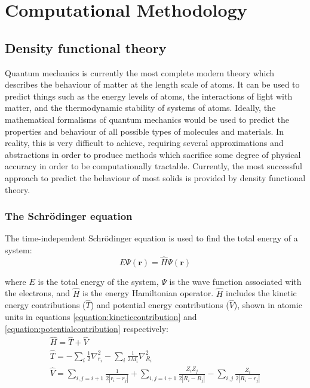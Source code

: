 \chapter{Computational Methodology}

\label{ch:compmethodology}

\section{Density functional theory} \label{section:dft}

Quantum mechanics is currently the most complete modern theory which describes the behaviour of matter at the length scale of atoms. It can be used to predict things such as the energy levels of atoms, the interactions of light with matter, and the thermodynamic stability of systems of atoms. Ideally, the mathematical formalisms of quantum mechanics would be used to predict the properties and behaviour of all possible types of molecules and materials. In reality, this is very difficult to achieve, requiring several approximations and abstractions in order to produce methods which sacrifice some degree of physical accuracy in order to be computationally tractable. Currently, the most successful approach to predict the behaviour of most solids is provided by density functional theory.

\subsection{The Schr\"{o}dinger equation}

The time-independent Schr\"{o}dinger equation is used to find the total energy of a system:
\begin{equation}
E\Psi(\textbf{r}) = \hat{H}\Psi(\textbf{r})
\label{equation:schrodinger}
\end{equation}

where $E$ is the total energy of the system, $\Psi$ is the wave function associated with the electrons, and $\hat{H}$ is the energy Hamiltonian operator. $\hat{H}$ includes the kinetic energy contributions ($\hat{T}$) and potential energy contributions ($\hat{V}$), shown in atomic units in equations \ref{equation:kineticcontribution} and \ref{equation:potentialcontribution} respectively:
\begin{gather}
\hat{H} = \hat{T} + \hat{V} \label{equation:hamiltonian}\\
\hat{T} = -\sum_i{\frac{1}{2}}\nabla^2_{r_i} - \sum_i{\frac{1}{2M_i}}\nabla^2_{R_i} \label{equation:kineticcontribution} \\
\hat{V} = \sum_{i,j=i+1}{\frac{1}{2|r_i - r_j|}} + \sum_{i,j=i+1}{\frac{Z_i Z_j}{2|R_i - R_j|}} - \sum_{i,j}{\frac{Z_i}{2|R_i - r_j|}} \label{equation:potentialcontribution}
\end{gather}

